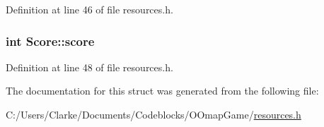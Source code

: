 Definition at line 46 of file resources.\-h.

\hypertarget{struct_score_a331b0927105c83ba760954eff6cf9fe9}{
\subsubsection[{score}]{\setlength{\rightskip}{0pt plus 5cm}int Score\-::score}}\label{struct_score_a331b0927105c83ba760954eff6cf9fe9}


Definition at line 48 of file resources.\-h.



The documentation for this struct was generated from the following file\-:\begin{DoxyCompactItemize}
\item 
C\-:/\-Users/\-Clarke/\-Documents/\-Codeblocks/\-O\-Omap\-Game/\hyperlink{resources_8h}{resources.\-h}\end{DoxyCompactItemize}
